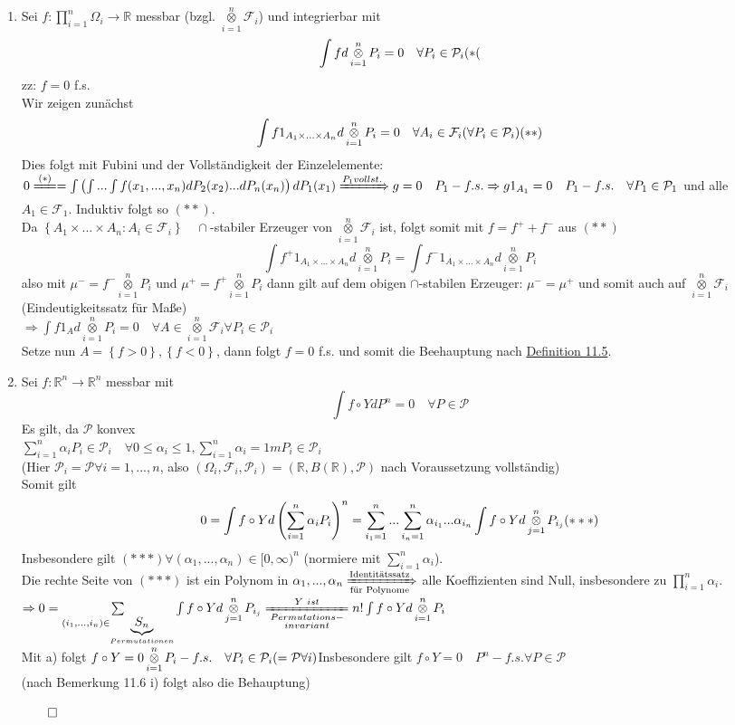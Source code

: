 \documentclass[german,10pt,oneside, fleqn, a4paper]{article}
\newcommand {\R}	{\mathbb{R}}
\newcommand{\Ra}	{\Rightarrow}
\newcommand{\ra}{\rightarrow}
\newcommand{\sm}[2][\infty]{\sum\limits_{#2}^{#1}}
\newcommand{\brc}[1]{\left(#1\right)}
\newcommand{\brac}[1]{\left\lbrace #1\right\rbrace}
\newcommand{\QED}{\begin{flushright}$\qed$\end{flushright}}
\newcommand{\mc}[1]{\mathcal{#1}}
\newcommand{\1}[1]{1_{#1}}
\newcommand{\2}[1]{\1{\brac{#1}}}
\newcommand{\f}{\mc{F}}
\newcommand{\p}{\mc{P}}
\newcommand{\sumi}{\sm[n]{i=1}}
\newcommand{\qf}{\quad\forall}
\DeclareMathOperator*{\kreuz}{\otimes}
\newcommand{\kreuzi}{\kreuz\limits_{i=1}^n}
\begin{document}
\begin{enumerate}[label=(\alph*)]
\item Sei $f:\prod\limits_{i=1}^n\Omega_i\ra\R$ messbar (bzgl. $\kreuz\limits_{i=1}^n\f_i$) und integrierbar mit \[\int fd\kreuz\limits_{i=1}^nP_i=0\qf P_i\in\p_i\hfill (*(\]
zz: $f=0$ f.s.\\
Wir zeigen zunächst\[\int f 1_{A_1\times...\times A_n}d\kreuzi P_i=0\qf A_i\in\f_i(\forall P_i\in\p_i)\hfill(**)\]
Dies folgt mit Fubini und der Vollständigkeit der Einzelelemente:$\\
0\xlongequal{(*)}=\int\brc{\int...\int f(x_1,...,x_n)dP_2(x_2)...dP_n(x_n)}dP_1(x_1)\\
\xRightarrow{P_1 vollst.}g=0\quad P_1-f.s.\Ra g1_{A_1}=0\quad P_1-f.s.\qf P_1\in\p_1$ und alle $A_1\in\f_1$. Induktiv folgt so $(**)$.\\
Da $\brac{A_1\times...\times A_n:A_i\in\f_i}\quad\cap$-stabiler Erzeuger von $\kreuzi\f_i$ ist, folgt somit mit $f=f^++f^-$ aus $(**)$\[
\int f^+1_{A_1\times...\times A_n}d\kreuzi P_i=\int f^-1_{A_1\times...\times A_n}d\kreuzi P_i\]
also  mit $\mu^-=f^-\kreuzi P_i$ und $\mu^+=f^+\kreuzi P_i$ dann gilt auf dem obigen $\cap$-stabilen Erzeuger: $\mu^-=\mu^+$ und somit auch auf $\kreuzi\f_i$ (Eindeutigkeitssatz für Maße)\\
$\Ra \int f1_Ad\kreuzi P_i=0\qf A\in\kreuzi\f_i\forall P_i\in\p_i$\\
Setze nun $A=\brac{f>0},\brac{f<0}$, dann folgt $f=0$ f.s. und somit die Beehauptung nach \hyperref[1.5]{Definition 11.5}.

\item Sei $f:\R^n\ra\R^n$ messbar mit \[
\int f\circ YdP^n=0\qf P\in\p\]
Es gilt, da $\p$ konvex\\
$\sumi \alpha_iP_i\in\p_i\qf0\leq\alpha_i\leq 1,\sumi \alpha_i=1m P_i\in\p_i$\\
(Hier $\p_i=\p\forall i=1,...,n$, also $(\Omega_i,\f_i,\p_i)=(\R,B(\R),\p)$ nach Voraussetzung vollständig)\\
Somit gilt\[0=\int f\circ Yd\brc{\sumi \alpha_iP_i}^n=\sum\limits_{i_1=1}^n...\sum\limits_{i_n=1}^n\alpha_{i_1}...\alpha_{i_n}\int f\circ Yd\kreuz\limits_{j=1}^n P_{i_j}\hfill(***)\]
Insbesondere gilt $(***)\forall(\alpha_1,...,\alpha_n)\in[0,\infty)^n$ (normiere mit $\sumi \alpha_i$).\\
Die rechte Seite von $(***)$ ist ein Polynom in $\alpha_1,...,\alpha_n\\
\xRightarrow[\text{für Polynome}]{\text{Identitätssatz}}$ alle Koeffizienten sind Null, insbesondere zu $\prod\limits_{i=1}^n\alpha_i.$\\
$\Ra 0=\sum\limits_{(i_1,...,i_n)\in \underbrace{S_n}_{Permutationen}}\int f\circ Yd\kreuz\limits_{j=1}^n P_{i_j}\xlongequal[\substack{Permutations-\\invariant}]{Y\ ist}n!\int f\circ Yd\kreuzi P_i$\\
Mit a) folgt $f\circ Y= 0\kreuzi P_i-f.s.\qf P_i\in\p_i(=\p \forall i)\\
$Insbesondere gilt $f\circ Y=0\quad P^n-f.s.\forall P\in\p$\\
(nach Bemerkung 11.6 i) folgt also die Behauptung)\QED
\end{enumerate}
\end{document}

